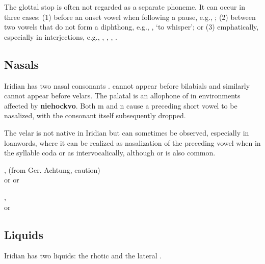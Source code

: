 \par The glottal stop \textipa{[P]} is often not regarded as a separate phoneme.
It can occur in three cases: (1) before an onset vowel when following a pause, e.g.,   ; (2) between two vowels that do not form a diphthong, e.g.,  , `to whisper'; or (3) emphatically, especially in interjections, e.g.,  , ,  , .


\subsection{Nasals}
Iridian has two nasal consonants .  cannot appear before bilabials and similarly  cannot appear before velars. The palatal \bt{\nn} is an allophone of  in environments affected by \textbf{niehockvo}. Both m and n cause a preceding short vowel to be nasalized, with the consonant itself subsequently dropped.

\xe

The velar  is not native in Iridian but can sometimes be observed, especially in loanwords, where it can be realized as nasalization of the preceding vowel when in the syllable coda or as  intervocalically, although  or  is also common.

\ex
{},  (from Ger. Achtung, caution)\\
 or  or 
\xe

\ex
{}, \\
 or 
\xe

\subsection{Liquids}

Iridian has two liquids: the rhotic  and the lateral .

